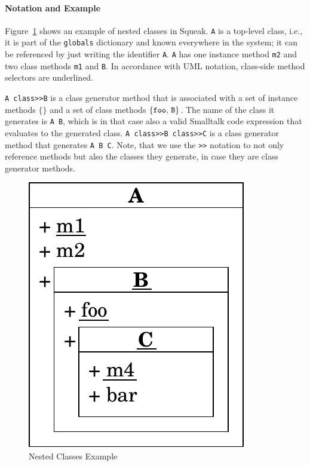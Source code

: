 \paragraph{Notation and Example}
Figure~\ref{fig:concept_nested_notation} shows an example of nested classes in Squeak. \texttt{A} is a top-level class, i.e., it is part of the \texttt{globals} dictionary and known everywhere in the system; it can be referenced by just writing the identifier \texttt{A}. \texttt{A} has one instance method \texttt{m2} and two class methods \texttt{m1} and \texttt{B}. In accordance with UML notation, class-side method selectors are underlined. 

\texttt{A class>>B} is a class generator method that is associated with a set of instance methods $\{\}$ and a set of class methods $\{\mbox{\texttt{foo}, \texttt{B}}\}$. The name of the class it generates is \texttt{A B}, which is in that case also a valid Smalltalk code expression that evaluates to the generated class. \texttt{A class>>B class>>C} is a class generator method that generates \texttt{A B C}. Note, that we use the \texttt{>>} notation to not only reference methods but also the classes they generate, in case they are class generator methods.

\begin{figure}[!htp]
	\includegraphics[scale=1]{nested_notation.pdf}
	\centering
	\caption{Nested Classes Example}
	\label{fig:concept_nested_notation}
\end{figure}

